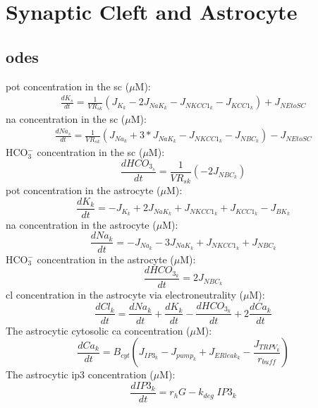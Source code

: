 \documentclass[11pt]{elsarticle}
\newcommand{\hco}{HCO$_3^-$\xspace}
\newcommand{\uM}{$\mu$M\xspace}
\newcommand{\na}{\gls{na}\xspace}
\newcommand{\pot}{\gls{pot}\xspace}
\newcommand{\cl}{\gls{cl}\xspace}
\newcommand{\ca}{\gls{ca}\xspace}
\newcommand{\ip}{\gls{ip3}\xspace}
\begin{document}
\section{Synaptic Cleft and Astrocyte}
%
\subsection{\Glspl{ode}}
%
\pot concentration in the \gls{sc} (\uM):
\begin{align}
\frac{d K_s}{dt} = \frac{1}{VR_{sk}} \left( J_{K_k} - 2 J_{NaK_k} - J_{NKCC1_k} - J_{KCC1_k} \right) + J_{NEtoSC}
\end{align}
%
\na concentration in the \gls{sc} (\uM):
\begin{align}
\frac{d Na_s}{dt} =  \frac{1}{VR_{sk}} \left( J_{Na_k} + 3*J_{NaK_k} - J_{NKCC1_k} - J_{NBC_k} \right) - J_{NEtoSC}
\end{align}
%
\hco concentration in the \gls{sc} (\uM):
\begin{equation} \label{eq:HCOEx}
\frac{d HCO_{3_{s}}}{dt}=  \frac{1}{VR_{sk}} \left( -2 J_{NBC_{k}} \right)
\end{equation} 
%
\pot concentration in the astrocyte (\uM):
\begin{equation} \label{eq:KInt}
\frac{d K_k}{dt}=- J_{K_k} + 2 J_{NaK_{k}} + J_{NKCC1_{k}} +  J_{KCC1_{k}}
- J_{BK_k}  
\end{equation}
%
\na concentration in the astrocyte (\uM):
\begin{equation} \label{eq:NaInt}
\frac{d Na_k}{dt}=-J_{Na_k} - 3 J_{NaK_{k}} + J_{NKCC1_{k}} +  J_{NBC_{k}}
\end{equation}
%
\hco concentration in the astrocyte (\uM):
\begin{equation} \label{eq:HCOInt}
\frac{d HCO_{3_k}}{dt}= 2 J_{NBC_{k}} 
\end{equation}
%
\cl concentration in the astrocyte via electroneutrality (\uM):
\begin{equation} \label{eq:ClInt}
\frac{d Cl_k}{dt}= \frac{dNa_k}{dt} + \frac{dK_k}{dt} - \frac{d HCO_{3_{k}}}{dt} + 2 \frac{d Ca_k}{dt}
\end{equation}
%
The astrocytic cytosolic \ca concentration (\uM):
\begin{equation}
\frac{d Ca_k}{dt} = B_{cyt} \left( J_{IP3_k} - J_{pump_k} + J_{ERleak_k} - \frac{J_{TRPV_k}}{r_{buff}} \right)
\label{eq:ACca}
\end{equation}	
%
The astrocytic \ip concentration (\uM):
\begin{equation}
\frac{d IP3_k}{dt} = r_h G - k_{deg} \; IP3_k
\end{equation}
\end{document}
